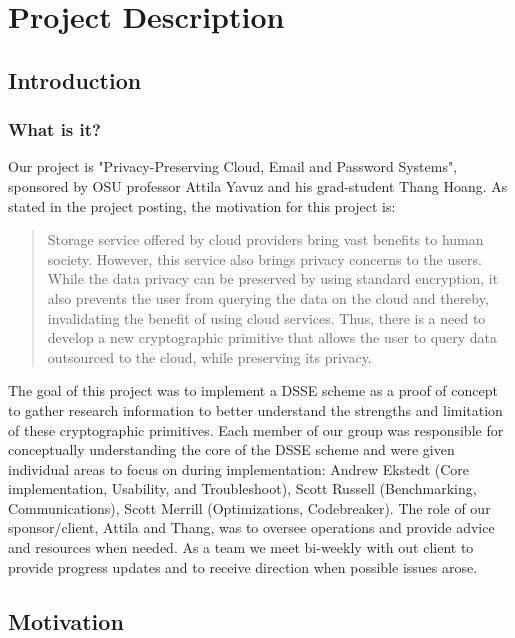\chapter{Project Description}

\section{Introduction}
\subsection{What is it?}

Our project is "Privacy-Preserving Cloud, Email and Password Systems", sponsored by OSU professor Attila Yavuz and his grad-student Thang Hoang.  As stated in the project posting, the motivation for this project is:

\begin{quote}
Storage service offered by cloud providers bring vast benefits to human society. However, this service also brings privacy concerns to the users. While the data privacy can be preserved by using standard encryption, it also prevents the user from querying the data on the cloud and thereby, invalidating the benefit of using cloud services. Thus, there is a need to develop a new cryptographic primitive that allows the user to query data outsourced to the cloud, while preserving its privacy.
\end{quote}

The goal of this project was to implement a DSSE scheme as a proof of concept to gather research information to better understand the strengths and limitation of these cryptographic primitives. Each member of our group was responsible for conceptually understanding the core of the DSSE scheme and were given individual areas to focus on during implementation: Andrew Ekstedt (Core implementation, Usability, and Troubleshoot), Scott Russell (Benchmarking, Communications), Scott Merrill (Optimizations, Codebreaker).
The role of our sponsor/client, Attila and Thang, was to oversee operations and provide advice and resources when needed. As a team we meet bi-weekly with out client to provide progress updates and to receive direction when possible issues arose.


\section{Motivation}

